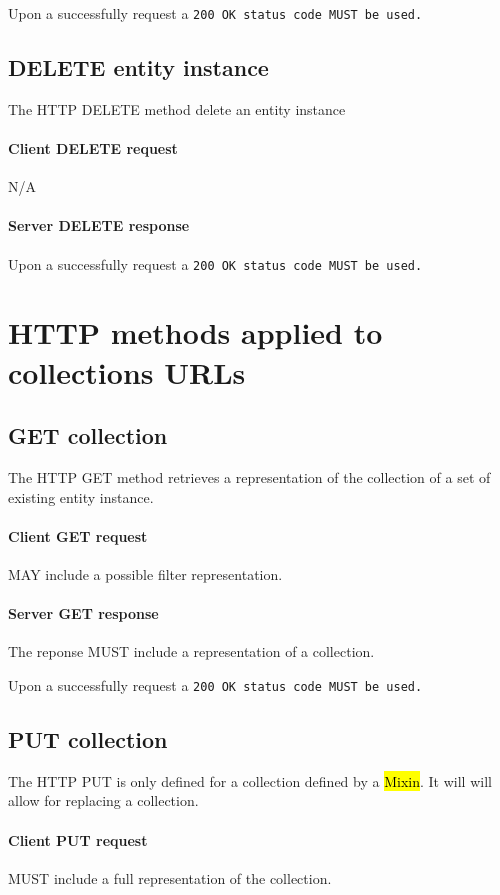 \documentclass[10pt,a4paper]{article}
\begin{document}
Upon a successfully request a \tt{200 OK} status code MUST be used.

\subsection{DELETE entity instance}
The HTTP DELETE method delete an entity instance

\paragraph{Client DELETE request}
N/A

\paragraph{Server DELETE response}
Upon a successfully request a \tt{200 OK} status code MUST be used.

\section{HTTP methods applied to collections URLs}

\subsection{GET collection}
The HTTP GET method retrieves a representation of the collection of a set of existing entity instance.

\paragraph{Client GET request}
MAY include a possible filter representation.

\paragraph{Server GET response}
The reponse MUST include a representation of a collection.

Upon a successfully request a \tt{200 OK} status code MUST be used.

\subsection{PUT collection}
The HTTP PUT is only defined for a collection defined by a \hl{Mixin}. It will will allow for replacing a collection.

\paragraph{Client PUT request}
MUST include a full representation of the collection.
\end{document}
